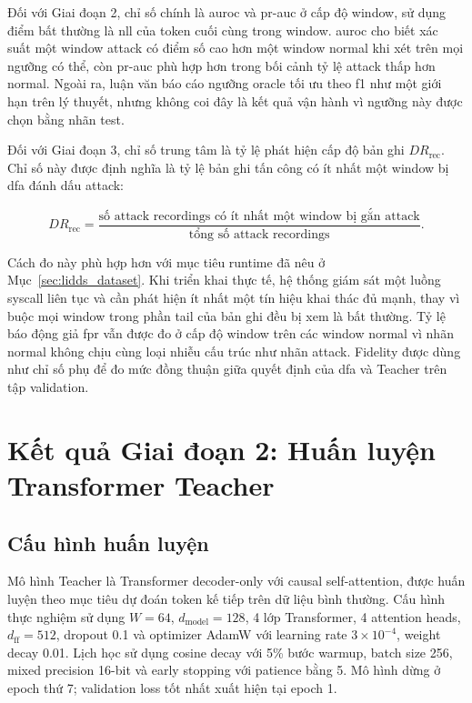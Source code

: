 \documentclass[../main.tex]{subfiles}
\begin{document}
Đối với Giai đoạn 2, chỉ số chính là \gls{auroc} \cite{fawcett2006auroc} và
\gls{pr-auc} ở cấp độ window,
sử dụng điểm
bất thường là \gls{nll} của token cuối cùng trong
window. \Gls{auroc}
cho biết xác suất một window attack có điểm số cao hơn một window
normal khi xét trên
mọi ngưỡng có thể, còn \gls{pr-auc} phù hợp hơn trong bối cảnh tỷ lệ attack
thấp hơn normal.
Ngoài ra, luận văn báo cáo ngưỡng oracle tối ưu theo \gls{f1} như một giới
hạn trên lý thuyết,
nhưng không coi đây là kết quả vận hành vì ngưỡng này được chọn bằng nhãn test.

Đối với Giai đoạn 3, chỉ số trung tâm là tỷ lệ phát hiện cấp độ bản ghi
$DR_{\text{rec}}$. Chỉ số này được định nghĩa là tỷ lệ bản ghi tấn
công có ít nhất
một window bị \gls{dfa} đánh dấu attack:

\begin{equation}
  \label{eq:dr_rec_ch5}
  DR_{\text{rec}} =
  \frac{\text{số attack recordings có ít nhất một window bị gắn attack}}
  {\text{tổng số attack recordings}}.
\end{equation}

Cách đo này phù hợp hơn với mục tiêu runtime đã nêu ở
Mục~\ref{sec:lidds_dataset}. Khi triển khai thực tế, hệ thống giám
sát một luồng \gls{syscall}
liên tục và cần phát hiện ít nhất một tín hiệu khai thác đủ mạnh,
thay vì buộc mọi window
trong phần tail của bản ghi đều bị xem là bất thường. Tỷ lệ báo động
giả \gls{fpr} vẫn được đo
ở cấp độ window trên các window normal vì nhãn normal không chịu cùng
loại nhiễu cấu trúc
như nhãn attack. Fidelity được dùng như chỉ số phụ để đo mức đồng
thuận giữa quyết định
của \gls{dfa} và Teacher trên tập validation.

\section{Kết quả Giai đoạn 2: Huấn luyện Transformer Teacher}
\label{sec:p2_results}

\subsection{Cấu hình huấn luyện}
\label{subsec:p2_training_setup}

Mô hình Teacher là Transformer decoder-only với causal
self-attention, được huấn luyện
theo mục tiêu dự đoán token kế tiếp trên dữ liệu bình thường. Cấu
hình thực nghiệm sử
dụng $W = 64$, $d_{\text{model}} = 128$, 4 lớp Transformer, 4 attention heads,
$d_{\text{ff}} = 512$, dropout 0.1 và optimizer AdamW với learning
rate $3 \times
10^{-4}$, weight decay 0.01. Lịch học sử dụng cosine decay với 5\%
bước warmup, batch
size 256, mixed precision 16-bit và early stopping với patience bằng
5. Mô hình dừng ở
epoch thứ 7; validation loss tốt nhất xuất hiện tại epoch 1.
\end{document}
